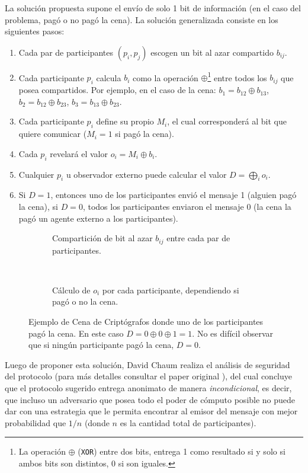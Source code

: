 La solución propuesta supone el envío de solo 1 bit de información (en el caso del problema, pagó o no pagó la cena). 
La solución generalizada consiste en los siguientes pasos:
\begin{enumerate}
    \item Cada par de participantes $(p_i, p_j)$ escogen un bit al azar compartido $b_{ij}$.
    \item Cada participante $p_i$ calcula $b_i$ como la operación $\oplus$\footnote{La operación $\oplus$ (\texttt{XOR}) entre 
    dos bits, entrega 1 como resultado si y solo si ambos bits son distintos, 0 si son iguales.} entre todos los $b_{ij}$ que posea 
    compartidos. Por ejemplo, en el caso de la cena: $b_1 = b_{12} \oplus b_{13}$, $b_2 = b_{12} \oplus b_{23}$, $b_3 = b_{13} \oplus b_{23}$.
    \item Cada participante $p_i$ define su propio $M_i$, el cual corresponderá al bit que quiere comunicar ($M_i = 1$ si pagó la cena).
    \item Cada $p_i$ revelará el valor $o_i = M_i \oplus b_i$.
    \item Cualquier $p_i$ u observador externo puede calcular el valor $D = \displaystyle\bigoplus_i o_i$.
    \item Si $D = 1$, entonces uno de los participantes envió el mensaje 1 (alguien pagó la cena), si $D = 0$, todos los participantes 
    enviaron el mensaje 0 (la cena la pagó un agente externo a los participantes).
\end{enumerate}

\begin{figure}[H]
\centering
\begin{subfigure}[b]{0.4\textwidth}
    
    \caption{Compartición de bit al azar $b_{ij}$ entre cada par de participantes.}
    \label{2a}
\end{subfigure}
~
\begin{subfigure}[b]{0.4\textwidth}
    
    \caption{Cálculo de $o_i$ por cada participante, dependiendo si pagó o no la cena.}
    \label{2b}
\end{subfigure}

\protect\caption{Ejemplo de Cena de Criptógrafos donde uno de los participantes pagó la cena. En este caso $D = 0 \oplus 0 \oplus 1 = 1$. 
No es difícil observar que si ningún participante pagó la cena, $D = 0$. }
\label{fig:example_dcnet_chaum}
\end{figure}

Luego de proponer esta solución, David Chaum realiza el análisis de seguridad del protocolo (para más detalles consultar el paper original 
\cite{chaum1988dining}), del cual concluye que el protocolo sugerido entrega anonimato de manera \emph{incondicional}, es decir, que incluso 
un adversario que posea todo el poder de cómputo posible no puede dar con una estrategia que le permita encontrar al emisor del mensaje 
con mejor probabilidad que $1/n$ (donde $n$ es la cantidad total de participantes).

